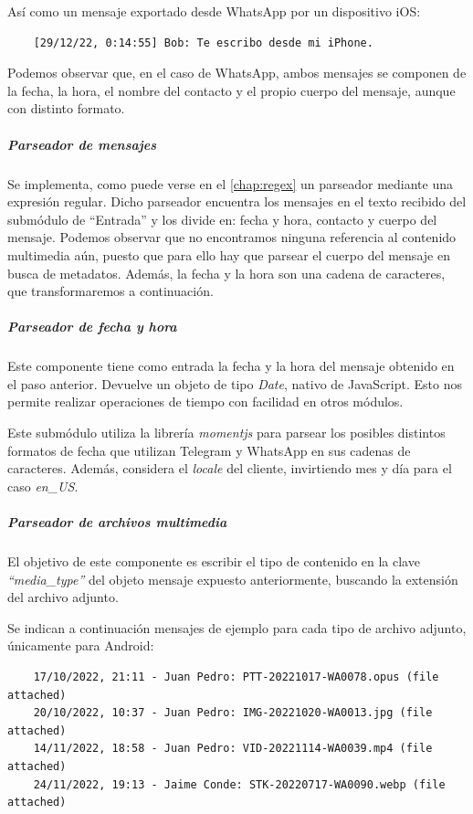 Así como un mensaje exportado desde WhatsApp por un dispositivo iOS:

\begin{lstlisting}
	[29/12/22, 0:14:55] Bob: Te escribo desde mi iPhone.
\end{lstlisting}

Podemos observar que, en el caso de WhatsApp, ambos mensajes se componen de la fecha, la hora, el nombre del contacto y el propio cuerpo del mensaje, aunque con distinto formato.

\subparagraph{Parseador de mensajes} Se implementa, como puede verse en el \autoref{chap:regex} un parseador mediante una expresión regular. Dicho parseador encuentra los mensajes en el texto recibido del submódulo de ``Entrada'' y los divide en: fecha y hora, contacto y cuerpo del mensaje. Podemos observar que no encontramos ninguna referencia al contenido multimedia aún, puesto que para ello hay que parsear el cuerpo del mensaje en busca de metadatos. Además, la fecha y la hora son una cadena de caracteres, que transformaremos a continuación.

\subparagraph{Parseador de fecha y hora} Este componente tiene como entrada la fecha y la hora del mensaje obtenido en el paso anterior. Devuelve un objeto de tipo \textit{Date}, nativo de JavaScript. Esto nos permite realizar operaciones de tiempo con facilidad en otros módulos.

Este submódulo utiliza la librería \textit{momentjs} para parsear los posibles distintos formatos de fecha que utilizan Telegram y WhatsApp en sus cadenas de caracteres. Además, considera el \textit{locale} del cliente, invirtiendo mes y día para el caso \textit{en\_US}.

\subparagraph{Parseador de archivos multimedia} El objetivo de este componente es escribir el tipo de contenido en la clave \textit{``media\_type''} del objeto mensaje expuesto anteriormente, buscando la extensión del archivo adjunto.

Se indican a continuación mensajes de ejemplo para cada tipo de archivo adjunto, únicamente para Android:

\begin{lstlisting}
	17/10/2022, 21:11 - Juan Pedro: PTT-20221017-WA0078.opus (file attached)
	20/10/2022, 10:37 - Juan Pedro: IMG-20221020-WA0013.jpg (file attached)
	14/11/2022, 18:58 - Juan Pedro: VID-20221114-WA0039.mp4 (file attached)
	24/11/2022, 19:13 - Jaime Conde: STK-20220717-WA0090.webp (file attached)
\end{lstlisting}

